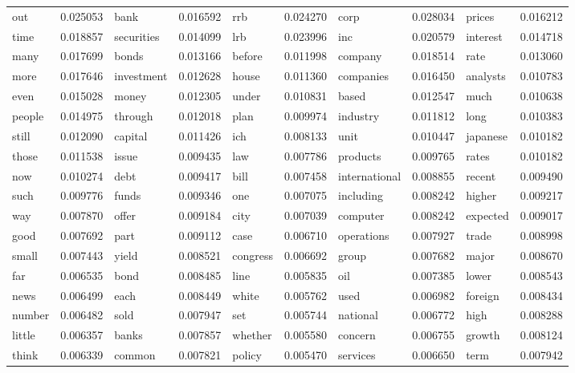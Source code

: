 \begin{table}[!ht]
  \footnotesize
  \begin{tabular}{llllllllll}

out & 0.025053 & bank & 0.016592 & rrb & 0.024270 & corp & 0.028034 & prices & 0.016212\\
time & 0.018857 & securities & 0.014099 & lrb & 0.023996 & inc & 0.020579 & interest & 0.014718\\
many & 0.017699 & bonds & 0.013166 & before & 0.011998 & company & 0.018514 & rate & 0.013060\\
more & 0.017646 & investment & 0.012628 & house & 0.011360 & companies & 0.016450 & analysts & 0.010783\\
even & 0.015028 & money & 0.012305 & under & 0.010831 & based & 0.012547 & much & 0.010638\\
people & 0.014975 & through & 0.012018 & plan & 0.009974 & industry & 0.011812 & long & 0.010383\\
still & 0.012090 & capital & 0.011426 & ich & 0.008133 & unit & 0.010447 & japanese & 0.010182\\
those & 0.011538 & issue & 0.009435 & law & 0.007786 & products & 0.009765 & rates & 0.010182\\
now & 0.010274 & debt & 0.009417 & bill & 0.007458 & international & 0.008855 & recent & 0.009490\\
such & 0.009776 & funds & 0.009346 & one & 0.007075 & including & 0.008242 & higher & 0.009217\\
way & 0.007870 & offer & 0.009184 & city & 0.007039 & computer & 0.008242 & expected & 0.009017\\
good & 0.007692 & part & 0.009112 & case & 0.006710 & operations & 0.007927 & trade & 0.008998\\
small & 0.007443 & yield & 0.008521 & congress & 0.006692 & group & 0.007682 & major & 0.008670\\
far & 0.006535 & bond & 0.008485 & line & 0.005835 & oil & 0.007385 & lower & 0.008543\\
news & 0.006499 & each & 0.008449 & white & 0.005762 & used & 0.006982 & foreign & 0.008434\\
number & 0.006482 & sold & 0.007947 & set & 0.005744 & national & 0.006772 & high & 0.008288\\
little & 0.006357 & banks & 0.007857 & whether & 0.005580 & concern & 0.006755 & growth & 0.008124\\
think & 0.006339 & common & 0.007821 & policy & 0.005470 & services & 0.006650 & term & 0.007942\\

\end{tabular}
\end{table}
